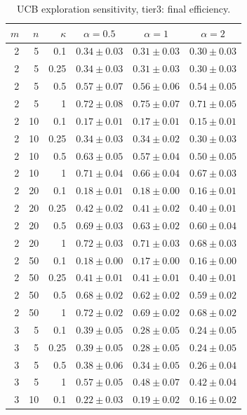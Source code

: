 \begin{table}[htbp]
\centering
\scriptsize
\caption{UCB exploration sensitivity, tier3: final efficiency.}
\label{tab:ucb_alpha_tier3_efficiency_last}
\begin{tabular}{@{}rrrccc@{}}
\toprule
$m$ & $n$ & $\kappa$ & $\alpha=0.5$ & $\alpha=1$ & $\alpha=2$ \\
\midrule
2 & 5 & 0.1 & $0.34 \pm 0.03$ & $0.31 \pm 0.03$ & $0.30 \pm 0.03$ \\
2 & 5 & 0.25 & $0.34 \pm 0.03$ & $0.31 \pm 0.03$ & $0.30 \pm 0.03$ \\
2 & 5 & 0.5 & $0.57 \pm 0.07$ & $0.56 \pm 0.06$ & $0.54 \pm 0.05$ \\
2 & 5 & 1 & $0.72 \pm 0.08$ & $0.75 \pm 0.07$ & $0.71 \pm 0.05$ \\
2 & 10 & 0.1 & $0.17 \pm 0.01$ & $0.17 \pm 0.01$ & $0.15 \pm 0.01$ \\
2 & 10 & 0.25 & $0.34 \pm 0.03$ & $0.34 \pm 0.02$ & $0.30 \pm 0.03$ \\
2 & 10 & 0.5 & $0.63 \pm 0.05$ & $0.57 \pm 0.04$ & $0.50 \pm 0.05$ \\
2 & 10 & 1 & $0.71 \pm 0.04$ & $0.66 \pm 0.04$ & $0.67 \pm 0.03$ \\
2 & 20 & 0.1 & $0.18 \pm 0.01$ & $0.18 \pm 0.00$ & $0.16 \pm 0.01$ \\
2 & 20 & 0.25 & $0.42 \pm 0.02$ & $0.41 \pm 0.02$ & $0.40 \pm 0.01$ \\
2 & 20 & 0.5 & $0.69 \pm 0.03$ & $0.63 \pm 0.02$ & $0.60 \pm 0.04$ \\
2 & 20 & 1 & $0.72 \pm 0.03$ & $0.71 \pm 0.03$ & $0.68 \pm 0.03$ \\
2 & 50 & 0.1 & $0.18 \pm 0.00$ & $0.17 \pm 0.00$ & $0.16 \pm 0.00$ \\
2 & 50 & 0.25 & $0.41 \pm 0.01$ & $0.41 \pm 0.01$ & $0.40 \pm 0.01$ \\
2 & 50 & 0.5 & $0.68 \pm 0.02$ & $0.62 \pm 0.02$ & $0.59 \pm 0.02$ \\
2 & 50 & 1 & $0.72 \pm 0.02$ & $0.69 \pm 0.02$ & $0.68 \pm 0.02$ \\
\midrule
3 & 5 & 0.1 & $0.39 \pm 0.05$ & $0.28 \pm 0.05$ & $0.24 \pm 0.05$ \\
3 & 5 & 0.25 & $0.39 \pm 0.05$ & $0.28 \pm 0.05$ & $0.24 \pm 0.05$ \\
3 & 5 & 0.5 & $0.38 \pm 0.06$ & $0.34 \pm 0.05$ & $0.26 \pm 0.04$ \\
3 & 5 & 1 & $0.57 \pm 0.05$ & $0.48 \pm 0.07$ & $0.42 \pm 0.04$ \\
3 & 10 & 0.1 & $0.22 \pm 0.03$ & $0.19 \pm 0.02$ & $0.16 \pm 0.02$ \\

\end{tabular}
\end{table}
